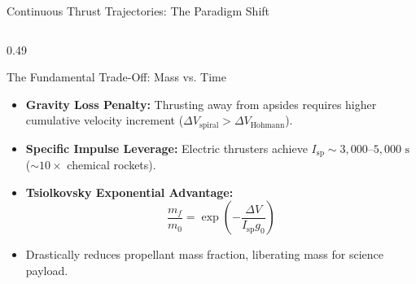 \documentclass[aspectratio=169, 10pt]{beamer}
\begin{document}
\begin{frame}{Continuous Thrust Trajectories: The Paradigm Shift}
\begin{columns}[T]
        \begin{column}{0.49\textwidth}
            \begin{block}{The Fundamental Trade-Off: Mass vs. Time}
                \scriptsize
                \begin{itemize}\setlength{\itemsep}{2pt}\setlength{\topsep}{1pt}
                    \item \textbf{Gravity Loss Penalty:} Thrusting away from apsides requires higher cumulative velocity increment ($\Delta V_{\text{spiral}} > \Delta V_{\text{Hohmann}}$).
                    \item \textbf{Specific Impulse Leverage:} Electric thrusters achieve $I_{\text{sp}} \sim 3{,}000\text{--}5{,}000\text{ s}$ ($\sim 10\times$ chemical rockets).
                    \item \textbf{Tsiolkovsky Exponential Advantage:}
                    $$\frac{m_f}{m_0} = \exp\left(-\frac{\Delta V}{I_{\text{sp}} g_0}\right)$$
                    \item Drastically reduces propellant mass fraction, liberating mass for science payload.
                \end{itemize}
            \end{block}
            \centering
        \end{column}
    \end{columns}
\end{frame}
\end{document}
